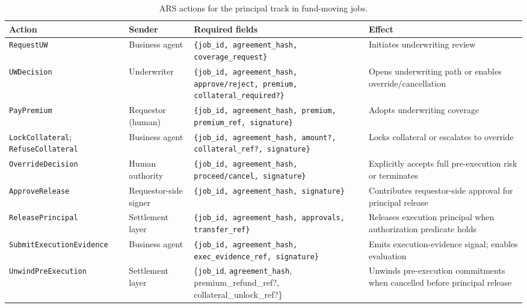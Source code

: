 \begin{table}[!ht]
\centering
\small
\setlength{\tabcolsep}{6pt}
\renewcommand{\arraystretch}{1.25}
\begin{tabular}{p{3.5cm}p{2.2cm}p{4.4cm}p{3.5cm}}
\hline
\textbf{Action} & \textbf{Sender} & \textbf{Required fields} & \textbf{Effect} \\
\hline
\texttt{RequestUW} & Business agent &
\texttt{\{job\_id, agreement\_hash, coverage\_request\}} &
Initiates underwriting review \\
\texttt{UWDecision} & Underwriter &
\texttt{\{job\_id, agreement\_hash, approve/reject, premium, collateral\_required?\}} &
Opens underwriting path or enables override/cancellation \\
\texttt{PayPremium} & Requestor (human) &
\texttt{\{job\_id, agreement\_hash, premium, premium\_ref, signature\}} &
Adopts underwriting coverage \\
\texttt{LockCollateral}; \texttt{RefuseCollateral} & Business agent &
\texttt{\{job\_id, agreement\_hash, amount?, collateral\_ref?, signature\}} &
Locks collateral or escalates to override \\
\texttt{OverrideDecision} & Human authority &
\texttt{\{job\_id, agreement\_hash, proceed/cancel, signature\}} &
Explicitly accepts full pre-execution risk or terminates \\
\texttt{ApproveRelease} & Requestor-side signer &
\texttt{\{job\_id, agreement\_hash, signature\}} &
Contributes requestor-side approval for principal release \\
\texttt{ReleasePrincipal} & Settlement layer &
\texttt{\{job\_id, agreement\_hash, approvals, transfer\_ref\}} &
Releases execution principal when authorization predicate holds \\
\texttt{SubmitExecutionEvidence} & Business agent &
\texttt{\{job\_id, agreement\_hash, exec\_evidence\_ref, signature\}} &
Emits execution-evidence signal; enables evaluation \\
\texttt{UnwindPreExecution} &
Settlement layer &
\{\texttt{job\_id}, \texttt{agreement\_hash}, premium\_refund\_ref?, collateral\_unlock\_ref?\} &
Unwinds pre-execution commitments when cancelled before principal release \\
\hline
\end{tabular}
\caption{\textsc{ARS} actions for the principal track in fund-moving jobs.}
\label{tab:arp-actions-principal}
\end{table}